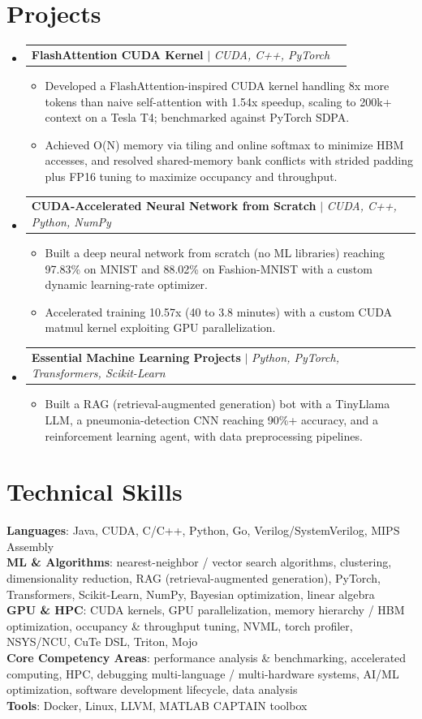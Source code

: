 \documentclass[letterpaper,11pt]{article}
\makeatletter
\newcommand{\resumeItem}[1]{
  \item\small{{#1 \vspace{-2pt}}}
}
\newcommand{\resumeProjectHeading}[2]{
    \item
    \begin{tabular*}{0.97\textwidth}{l@{\extracolsep{\fill}}r}
      \small#1 & #2 \\
    \end{tabular*}\vspace{-7pt}
}
\newcommand{\resumeSubHeadingListStart}{\begin{itemize}[leftmargin=0.15in, label={}]}
\newcommand{\resumeSubHeadingListEnd}{\end{itemize}}
\newcommand{\resumeItemListStart}{\begin{itemize}}
\newcommand{\resumeItemListEnd}{\end{itemize}\vspace{-5pt}}
\makeatother
\begin{document}
\section{Projects}
    \resumeSubHeadingListStart
    \resumeProjectHeading
        {\textbf{FlashAttention CUDA Kernel} $|$ \emph{CUDA, C++, PyTorch}}{}
      \resumeItemListStart
        \resumeItem{Developed a FlashAttention-inspired CUDA kernel handling 8x more tokens than naive self-attention with 1.54x speedup, scaling to 200k+ context on a Tesla T4; benchmarked against PyTorch SDPA.}
        \resumeItem{Achieved O(N) memory via tiling and online softmax to minimize HBM accesses, and resolved shared-memory bank conflicts with strided padding plus FP16 tuning to maximize occupancy and throughput.}
      \resumeItemListEnd
    \resumeProjectHeading
        {\textbf{CUDA-Accelerated Neural Network from Scratch} $|$ \emph{CUDA, C++, Python, NumPy}}{}
      \resumeItemListStart
        \resumeItem{Built a deep neural network from scratch (no ML libraries) reaching 97.83\% on MNIST and 88.02\% on Fashion-MNIST with a custom dynamic learning-rate optimizer.}
        \resumeItem{Accelerated training 10.57x (40 to 3.8 minutes) with a custom CUDA matmul kernel exploiting GPU parallelization.}
      \resumeItemListEnd
    \resumeProjectHeading
        {\textbf{Essential Machine Learning Projects} $|$ \emph{Python, PyTorch, Transformers, Scikit-Learn}}{}
      \resumeItemListStart
        \resumeItem{Built a RAG (retrieval-augmented generation) bot with a TinyLlama LLM, a pneumonia-detection CNN reaching 90\%+ accuracy, and a reinforcement learning agent, with data preprocessing pipelines.}
      \resumeItemListEnd
    \resumeSubHeadingListEnd

\section{Technical Skills}
 \begin{itemize}[leftmargin=0.15in, label={}]
    \small{\item{
     \textbf{Languages}{: Java, CUDA, C/C++, Python, Go, Verilog/SystemVerilog, MIPS Assembly} \\
     \textbf{ML \& Algorithms}{: nearest-neighbor / vector search algorithms, clustering, dimensionality reduction, RAG (retrieval-augmented generation), PyTorch, Transformers, Scikit-Learn, NumPy, Bayesian optimization, linear algebra} \\
     \textbf{GPU \& HPC}{: CUDA kernels, GPU parallelization, memory hierarchy / HBM optimization, occupancy \& throughput tuning, NVML, torch profiler, NSYS/NCU, CuTe DSL, Triton, Mojo} \\
     \textbf{Core Competency Areas}{: performance analysis \& benchmarking, accelerated computing, HPC, debugging multi-language / multi-hardware systems, AI/ML optimization, software development lifecycle, data analysis} \\
     \textbf{Tools}{: Docker, Linux, LLVM, MATLAB CAPTAIN toolbox}
    }}
 \end{itemize}
\end{document}
